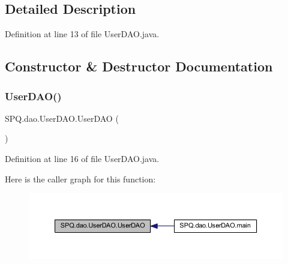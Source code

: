 \subsection{Detailed Description}


Definition at line 13 of file User\+D\+A\+O.\+java.



\subsection{Constructor \& Destructor Documentation}
\mbox{\label{class_s_p_q_1_1dao_1_1_user_d_a_o_ae1c3b0aaf2795cc7d4afec61cce3ec02}} 
\subsubsection{\texorpdfstring{User\+D\+A\+O()}{UserDAO()}\hspace{0.1cm}{\footnotesize\ttfamily [1/4]}}
{\footnotesize\ttfamily S\+P\+Q.\+dao.\+User\+D\+A\+O.\+User\+D\+AO (\begin{DoxyParamCaption}{ }\end{DoxyParamCaption})}



Definition at line 16 of file User\+D\+A\+O.\+java.

Here is the caller graph for this function\+:\nopagebreak
\begin{figure}[H]
\begin{center}
\leavevmode
\includegraphics[width=350pt]{class_s_p_q_1_1dao_1_1_user_d_a_o_ae1c3b0aaf2795cc7d4afec61cce3ec02_icgraph}
\end{center}
\end{figure}
\mbox{\label{class_s_p_q_1_1dao_1_1_user_d_a_o_ae1c3b0aaf2795cc7d4afec61cce3ec02}} 
